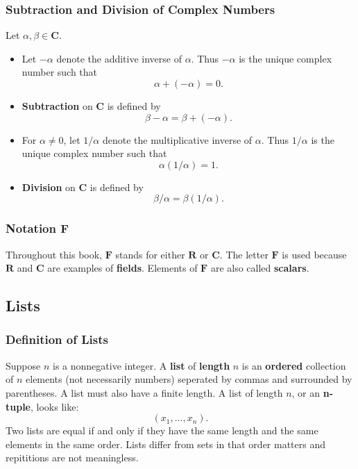 \documentclass{article}
\begin{document}
	\subsubsection{Subtraction and Division of Complex Numbers}
	Let $\alpha,\beta\in\mathbf{C}$.
	\begin{itemize}
		\item Let $-\alpha$ denote the additive inverse of $\alpha$. Thus $-\alpha$ is the unique complex number such that
		\begin{equation*}
			\alpha + (-\alpha) = 0.
		\end{equation*}
		\item \textbf{Subtraction} on $\mathbf{C}$ is defined by
		\begin{equation*}
			\beta - \alpha = \beta + (-\alpha).
		\end{equation*}
		\item For $\alpha\neq0$, let $1/\alpha$ denote the multiplicative inverse of $\alpha$. Thus $1/\alpha$ is the unique complex number such that
		\begin{equation*}
			\alpha(1/\alpha) = 1.
		\end{equation*}
		\item \textbf{Division} on $\mathbf{C}$ is defined by
		\begin{equation*}
			\beta/\alpha = \beta(1/\alpha).
		\end{equation*}
	\end{itemize}

	\subsubsection{Notation $\mathbf{F}$}
	Throughout this book, $\mathbf{F}$ stands for either $\mathbf{R}$ or $\mathbf{C}$. The letter $\mathbf{F}$ is used because $\mathbf{R}$ and $\mathbf{C}$ are examples of \textbf{fields}. Elements of $\mathbf{F}$ are also called \textbf{scalars}.

	\subsection{Lists}
	\subsubsection{Definition of Lists}
	Suppose $n$ is a nonnegative integer. A \textbf{list} of \textbf{length} $n$ is an \textbf{ordered} collection of $n$ elements (not necessarily numbers) seperated by commas and surrounded by parentheses. A list must also have a finite length. A list of length $n$, or an \textbf{n-tuple}, looks like:
	\begin{equation*}
		\left( x_1, ..., x_n \right).
	\end{equation*} 
	Two lists are equal if and only if they have the same length and the same elements in the same order. Lists differ from sets in that order matters and repititions are not meaningless.
\end{document}
